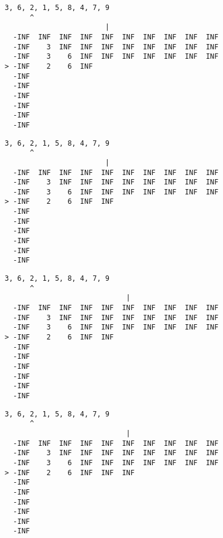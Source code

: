 { \begin{verbatim}
3, 6, 2, 1, 5, 8, 4, 7, 9
      ^
                        |
  -INF  INF  INF  INF  INF  INF  INF  INF  INF  INF
  -INF    3  INF  INF  INF  INF  INF  INF  INF  INF
  -INF    3    6  INF  INF  INF  INF  INF  INF  INF
> -INF    2    6  INF                              
  -INF                                             
  -INF                                             
  -INF                                             
  -INF                                             
  -INF                                             
  -INF                                             
\end{verbatim} }

{ \begin{verbatim}
3, 6, 2, 1, 5, 8, 4, 7, 9
      ^
                        |
  -INF  INF  INF  INF  INF  INF  INF  INF  INF  INF
  -INF    3  INF  INF  INF  INF  INF  INF  INF  INF
  -INF    3    6  INF  INF  INF  INF  INF  INF  INF
> -INF    2    6  INF  INF                         
  -INF                                             
  -INF                                             
  -INF                                             
  -INF                                             
  -INF                                             
  -INF                                             
\end{verbatim} }

{ \begin{verbatim}
3, 6, 2, 1, 5, 8, 4, 7, 9
      ^
                             |
  -INF  INF  INF  INF  INF  INF  INF  INF  INF  INF
  -INF    3  INF  INF  INF  INF  INF  INF  INF  INF
  -INF    3    6  INF  INF  INF  INF  INF  INF  INF
> -INF    2    6  INF  INF                         
  -INF                                             
  -INF                                             
  -INF                                             
  -INF                                             
  -INF                                             
  -INF                                             
\end{verbatim} }

{ \begin{verbatim}
3, 6, 2, 1, 5, 8, 4, 7, 9
      ^
                             |
  -INF  INF  INF  INF  INF  INF  INF  INF  INF  INF
  -INF    3  INF  INF  INF  INF  INF  INF  INF  INF
  -INF    3    6  INF  INF  INF  INF  INF  INF  INF
> -INF    2    6  INF  INF  INF                    
  -INF                                             
  -INF                                             
  -INF                                             
  -INF                                             
  -INF                                             
  -INF                                             
\end{verbatim} }

